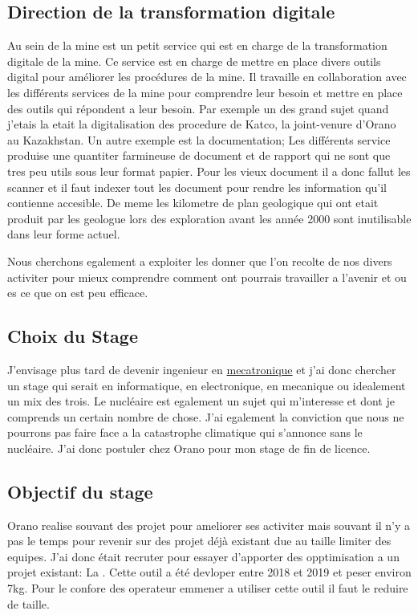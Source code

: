 \subsection{Direction de la transformation digitale}
Au sein de la mine est un petit service qui est en charge de la transformation digitale de la mine. Ce service est en charge de mettre en place divers outils digital pour améliorer les procédures de la mine. Il travaille en collaboration avec les différents services de la mine pour comprendre leur besoin et mettre en place des outils qui répondent a leur besoin. Par exemple un des grand sujet quand j'etais la etait la digitalisation des procedure de Katco, la joint-venure d'Orano au Kazakhstan. Un autre exemple est la documentation; Les différents service produise une quantiter farmineuse de document et de rapport qui ne sont que tres peu utils sous leur format papier. Pour les vieux document il a donc fallut les scanner et il faut indexer tout les document pour rendre les information qu'il contienne accesible. De meme les kilometre de plan geologique qui ont etait produit par les geologue lors des exploration avant les année 2000 sont inutilisable dans leur forme actuel.

Nous cherchons egalement a exploiter les donner que l'on recolte de nos divers activiter pour mieux comprendre comment ont pourrais travailler a l'avenir et ou es ce que on est peu efficace.

\subsection{Choix du Stage}
J'envisage plus tard de devenir ingenieur en \href{https://fr.wikipedia.org/wiki/M%C3%A9catronique}{mecatronique} et j'ai donc chercher un stage qui serait en informatique, en electronique, en mecanique ou idealement un mix des trois. Le nucléaire est egalement un sujet qui m'interesse et dont je comprends un certain nombre de chose. J'ai egalement la conviction que nous ne pourrons pas faire face a la catastrophe climatique qui s'annonce sans le nucléaire. J'ai donc postuler chez Orano pour mon stage de fin de licence. 
\subsection{Objectif du stage}

Orano realise souvant des projet pour ameliorer ses activiter mais souvant il n'y a pas le temps pour revenir sur des projet déjà existant due au taille limiter des equipes. J'ai donc était recruter pour essayer d'apporter des opptimisation a un projet existant: La . Cette outil a été devloper entre 2018 et 2019 et peser environ 7kg. Pour le confore des operateur emmener a utiliser cette outil il faut le reduire de taille.